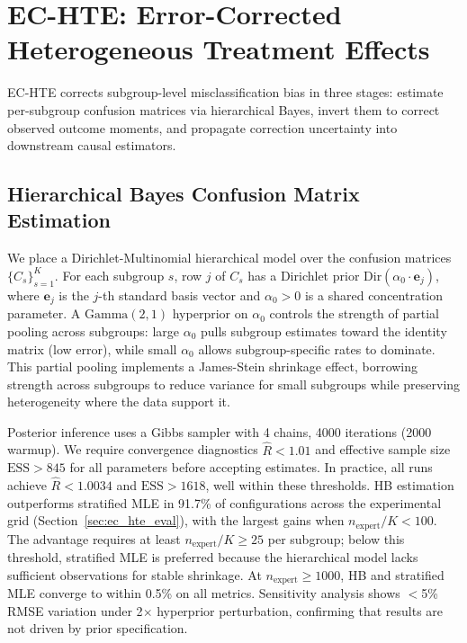 \section{EC-HTE: Error-Corrected Heterogeneous Treatment Effects}
\label{sec:method}

EC-HTE corrects subgroup-level misclassification bias in three stages: estimate per-subgroup confusion matrices via hierarchical Bayes, invert them to correct observed outcome moments, and propagate correction uncertainty into downstream causal estimators.

\subsection{Hierarchical Bayes Confusion Matrix Estimation}

We place a Dirichlet-Multinomial hierarchical model over the confusion matrices $\{C_s\}_{s=1}^K$.
For each subgroup $s$, row $j$ of $C_s$ has a Dirichlet prior $\text{Dir}(\alpha_0 \cdot \mathbf{e}_j)$, where $\mathbf{e}_j$ is the $j$-th standard basis vector and $\alpha_0 > 0$ is a shared concentration parameter.
A $\text{Gamma}(2, 1)$ hyperprior on $\alpha_0$ controls the strength of partial pooling across subgroups: large $\alpha_0$ pulls subgroup estimates toward the identity matrix (low error), while small $\alpha_0$ allows subgroup-specific rates to dominate.
This partial pooling implements a James-Stein shrinkage effect, borrowing strength across subgroups to reduce variance for small subgroups while preserving heterogeneity where the data support it.

Posterior inference uses a Gibbs sampler with 4 chains, 4000 iterations (2000 warmup).
We require convergence diagnostics $\hat{R} < 1.01$ and effective sample size $\text{ESS} > 845$ for all parameters before accepting estimates.
In practice, all runs achieve $\hat{R} < 1.0034$ and $\text{ESS} > 1618$, well within these thresholds.
HB estimation outperforms stratified MLE in 91.7\% of configurations across the experimental grid (Section~\ref{sec:ec_hte_eval}), with the largest gains when $n_{\text{expert}} / K < 100$.
The advantage requires at least $n_{\text{expert}} / K \geq 25$ per subgroup; below this threshold, stratified MLE is preferred because the hierarchical model lacks sufficient observations for stable shrinkage.
At $n_{\text{expert}} \geq 1000$, HB and stratified MLE converge to within 0.5\% on all metrics.
Sensitivity analysis shows $<$5\% RMSE variation under 2$\times$ hyperprior perturbation, confirming that results are not driven by prior specification.

